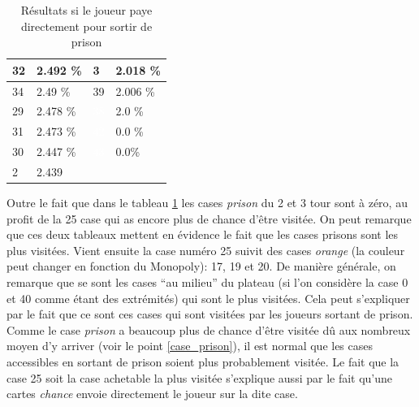 \documentclass[letterpaper]{article}
\begin{document}
\begin{table}[h]
\begin{tabular}{|l|l||l|l|}
	  \cellcolor[HTML]{2E8B57} 32 & 2.492 \%  & \cellcolor[HTML]{EEEED1}  3 & 2.018 \% \\ \hline
	  \cellcolor[HTML]{EEEED1} 34 & 2.49 \%   & \cellcolor[HTML]{8B1A1A} 39 & 2.006 \% \\ \hline
	  \cellcolor[HTML]{FFFFF0} 29 & 2.478 \%  & \cellcolor[HTML]{483D8B} \textcolor{white}{38} & 2.0 \%   \\ \hline
	  \cellcolor[HTML]{BEBEBE} 31 & 2.473 \%  & \cellcolor[HTML]{000000} \textcolor{white}{42} & 0.0 \%   \\ \hline
	  \cellcolor[HTML]{FFD700} 30 & 2.447 \%  & \cellcolor[HTML]{000000} \textcolor{white}{43} & 0.0\%    \\ \hline
	  \cellcolor[HTML]{A0522D}  2 & 2.439 \\ \cline{1-2}
	\end{tabular}
	\caption{Résultats si le joueur paye directement pour 
	  sortir de prison}
	\label{result_paye}
      \end{table}
      Outre le fait que dans le tableau \ref{result_paye} les cases \textit{prison} du 
      2 et 3 tour sont à zéro, au profit de la 25 case qui as 
      encore plus de chance d'être visitée.  On peut remarque que ces deux tableaux 
      mettent en évidence le fait que les cases prisons sont les plus visitées.
      Vient ensuite la case numéro 25 suivit des cases \textit{orange} (la couleur peut changer en 
      fonction du Monopoly): 17, 19 et 20.  De manière générale, on remarque que se sont les cases 
      ``au milieu'' du plateau (si l'on considère la case 0 et 40 comme étant des extrémités) qui
      sont le plus visitées.  Cela peut s'expliquer par le fait que ce sont ces cases qui sont visitées
      par les joueurs sortant de prison.  Comme le case \textit{prison} a beaucoup plus de chance 
      d'être visitée dû aux nombreux moyen d'y arriver (voir le point \ref{case_prison}), il est
      normal que les cases accessibles en sortant de prison soient plus probablement visitée. Le fait
      que la case 25 soit la case achetable la plus visitée s'explique aussi par le fait qu'une 
      cartes \textit{chance} envoie directement le joueur sur la dite case.
      
\end{document}
